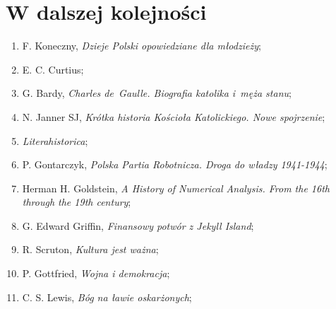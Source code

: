 \documentclass[a4paper,11pt]{article}
\begin{document}
\section{W dalszej kolejności}

\vspace{2em}



\begin{enumerate}

\item F. Koneczny, \textit{Dzieje Polski opowiedziane dla młodzieży};



\item E. C. Curtius;



\item G. Bardy, \textit{Charles de~Gaulle. Biografia katolika i~męża
    stanu};



\item N. Janner SJ, \textit{Krótka historia Kościoła Katolickiego. Nowe
    spojrzenie};



\item \textit{Literahistorica};



\item P. Gontarczyk, \textit{Polska Partia Robotnicza. Droga do władzy
    1941-1944};



\item Herman H. Goldstein, \textit{A History of Numerical Analysis. From
    the 16th through the 19th century};



\item G. Edward Griffin, \textit{Finansowy potwór z Jekyll Island};



\item R. Scruton, \textit{Kultura jest ważna};



\item P. Gottfried, \textit{Wojna i demokracja};



\item C. S. Lewis, \textit{Bóg na ławie oskarżonych};




\end{enumerate}
\end{document}
